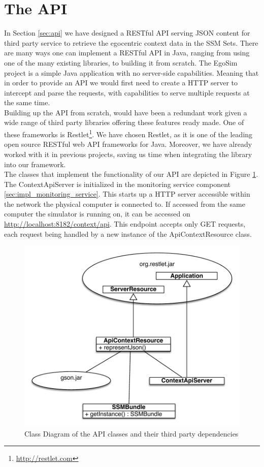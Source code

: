 \section{The API} %
\label{sec:impl_api}
In Section \ref{sec:api} we have designed a RESTful API serving JSON content for third party service to retrieve the egocentric context data in the SSM Sets. There are many ways one can implement a RESTful API in Java, ranging from using one of the many existing libraries, to building it from scratch. The EgoSim project is a simple Java application with no server-side capabilities. Meaning that in order to provide an API we would first need to create a HTTP server to intercept and parse the requests, with capabilities to serve multiple requests at the same time.\\

Building up the API from scratch, would have been a redundant work given a wide range of third party libraries offering these features ready made. One of these frameworks is Restlet\footnote{\url{http://restlet.com}}. We have chosen Restlet, as it is one of the leading open source RESTful web API frameworks for Java. Moreover, we have already worked with it in previous projects, saving us time when integrating the library into our framework.\\

The classes that implement the functionality of our API are depicted in Figure \ref{fig:impl_api}. The ContextApiServer is initialized in the monitoring service component \ref{sec:impl_monitoring_service}. This starts up a HTTP server accessible within the network the physical computer is connected to. If accessed from the same computer the simulator is running on, it can be accessed on \url{http://localhost:8182/context/api}. This endpoint accepts only GET requests, each request being handled by a new instance of the ApiContextResource class.
\begin{figure}[H]
	\centering
	\includegraphics[width=\linewidth]{gfx/Chapter4/api}
	\caption{Class Diagram of the API classes and their third party dependencies}
	\label{fig:impl_api}
\end{figure}

